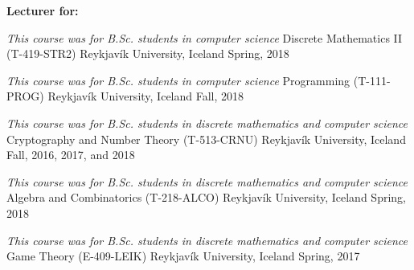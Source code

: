 


\begin{cventries}

\begin{flushleft}
\textbf{Lecturer for:}
\end{flushleft}


\cventrypresentation
  {\textit{This course was for B.Sc. students in computer science}} %
  {Discrete Mathematics II (T-419-STR2)} %
  {Reykjavík University, Iceland} %
  {Spring, 2018} %


\cventrypresentation
  {\textit{This course was for B.Sc. students in computer science}} %
  {Programming (T-111-PROG)} %
  {Reykjavík University, Iceland} %
  {Fall, 2018} %

\cventrypresentation
  {\textit{This course was for B.Sc. students in discrete mathematics and computer science}} %
  {Cryptography and Number Theory (T-513-CRNU)} %
  {Reykjavík University, Iceland} %
  {Fall, 2016, 2017, and 2018} %

\cventrypresentation
  {\textit{This course was for B.Sc. students in discrete mathematics and computer science}} %
  {Algebra and Combinatorics (T-218-ALCO)} %
  {Reykjavík University, Iceland} %
  {Spring, 2018} %


\cventrypresentation
  {\textit{This course was for B.Sc. students in discrete mathematics and computer science}} %
  {Game Theory (E-409-LEIK)} %
  {Reykjavík University, Iceland} %
  {Spring, 2017} %



\end{cventries}
